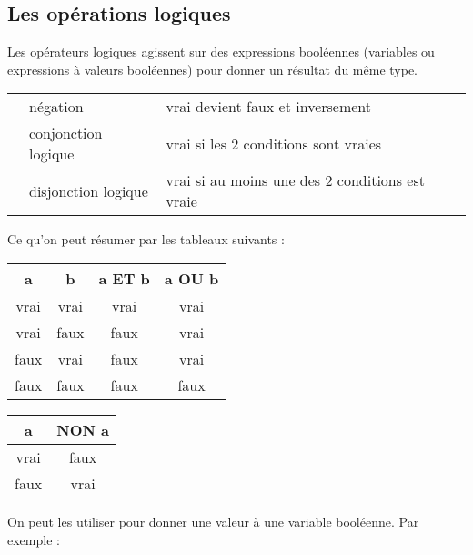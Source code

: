 		\subsection{Les opérations logiques}
	
			Les opérateurs logiques agissent sur des expressions booléennes 
			(variables ou expressions à valeurs booléennes) 
			pour donner un résultat du même type.
	
			\begin{center}
			\begin{tabular}{m{1cm}|m{3cm}|m{8cm}}
			\raggedleft \lda{NON} & négation & vrai devient faux et inversement\\
			\raggedleft \lda{ET} & conjonction logique & vrai si les 2 conditions sont vraies\\
			\raggedleft \lda{OU} & disjonction logique & vrai si au moins une des 2 conditions est vraie\\
			\end{tabular}
			\end{center}
			
			Ce qu'on peut résumer par les tableaux suivants :
			
			\begin{center}
			\begin{tabular}{|cccc|}
				\hline
				a & b & a ET b & a OU b \\
				\hline
				vrai & vrai & vrai & vrai \\\hline
				vrai & faux & faux & vrai \\\hline
				faux & vrai & faux & vrai \\\hline
				faux & faux & faux & faux \\\hline				
			\end{tabular}
			\qquad
			\begin{tabular}{|cc|}
				\hline
				a & NON a \\
				\hline
				vrai & faux \\\hline
				faux & vrai \\\hline
			\end{tabular}
			\end{center}

\clearpage			
			On peut les utiliser 
			pour donner une valeur à une variable booléenne.
			Par exemple :
			
